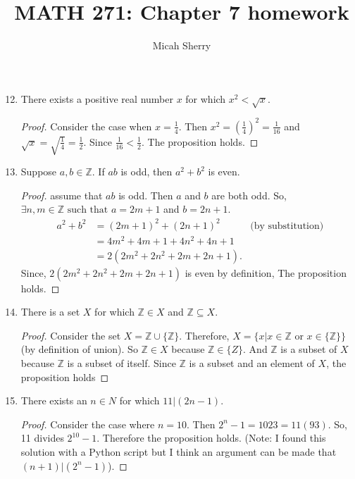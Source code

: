 \documentclass{article}
\title{MATH 271: Chapter 7 homework}
\author{Micah Sherry}
\newcommand{\Z}{\mathbb{Z}}
\newcommand{\st}{\text{ such that }}
\begin{document}
	\maketitle
	
	\begin{enumerate}
		\setcounter{enumi}{11}
		\item There exists a positive real number $x$ for which $x^2 <\sqrt{x}$.
			\begin{proof} 
				Consider the case when $x = \frac{1}{4}$. Then 
				$x^2= (\frac{1}{4})^2 = \frac{1}{16}$  and $\sqrt{x} = \sqrt{\frac{1}{4}} =\frac{1}{2}$. Since $\frac{1}{16} < \frac{1}{2}$. The proposition holds.
			\end{proof}
		\setcounter{enumi}{15}
		\item Suppose $a,b \in \Z$. If $ab$ is odd, then $a^2+b^2$ is even.
		\begin{proof}
			assume that $ab$ is odd. Then $a$ and $b$ are both odd. So, $\exists n,m \in \Z \st a= 2m+1$ and $ b=2n+1$.
			\begin{align*}
				a^2+b^2 &= (2m+1)^2 +(2n+1)^2 		& \text{(by substitution)}\\
						&= 4m^2+4m + 1 +4n^2+4n + 1 \\
						&= 2(2m^2+2n^2+2m+2n+1).
			\end{align*}
			Since, $2(2m^2+2n^2+2m+2n+1)$ is even by definition, The proposition holds.
		\end{proof}
		
		\setcounter{enumi}{17}
		\item There is a set $X$ for which $\Z \in X$ and $\Z \subseteq X$.
		\begin{proof}
			Consider the set $X = \Z \cup \{\Z\}$. Therefore, $X = \{x| x \in \Z \text{ or } x \in \{\Z\}  \}$ (by definition of union). So $\Z \in X$ because $\Z \in \{Z\}$. And $\Z$ is a subset of $X$ because $\Z$ is a subset of itself.  Since $\Z$ is a subset and an element of $X$, the proposition holds
		\end{proof} 
		
		\setcounter{enumi}{19}
		\item There exists an $n \in N$ for which $11 | (2n - 1)$.
		\begin{proof}
			Consider the case where $n=10$. Then $2^n-1 = 1023 = 11(93)$. So, 11 divides $2^{10}-1$. Therefore the proposition holds. (Note: I found this solution with a Python script but I think an argument can be made that $(n+1)|(2^n-1)$).
		\end{proof}
		

\end{enumerate}
\end{document}
